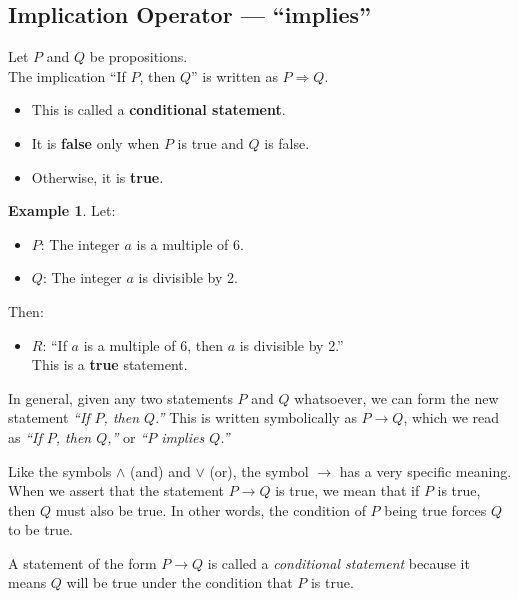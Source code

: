 \documentclass[
]{book}
\providecommand{\tightlist}{%
  \setlength{\itemsep}{0pt}\setlength{\parskip}{0pt}}
\theoremstyle{definition}
\theoremstyle{definition}
\newtheorem{example}{Example}[chapter]
\theoremstyle{definition}
\theoremstyle{definition}
\theoremstyle{remark}
\begin{document}
\subsection{Implication Operator --- ``implies''}\label{implication-operator-implies}

Let \(P\) and \(Q\) be propositions.\\
The implication ``If \(P\), then \(Q\)'' is written as \(P \Rightarrow Q\).

\begin{itemize}
\tightlist
\item
  This is called a \textbf{conditional statement}.
\item
  It is \textbf{false} only when \(P\) is true and \(Q\) is false.
\item
  Otherwise, it is \textbf{true}.
\end{itemize}

\begin{example}
\protect\hypertarget{exm:unnamed-chunk-20}{}\label{exm:unnamed-chunk-20}Let:

\begin{itemize}
\tightlist
\item
  \(P\): The integer \(a\) is a multiple of 6.
\item
  \(Q\): The integer \(a\) is divisible by 2.
\end{itemize}

Then:

\begin{itemize}
\tightlist
\item
  \(R\): ``If \(a\) is a multiple of 6, then \(a\) is divisible by 2.''\\
  This is a \textbf{true} statement.
\end{itemize}

In general, given any two statements \(P\) and \(Q\) whatsoever, we can form the new statement \emph{``If \( P \), then \( Q \).''} This is written symbolically as \(P \rightarrow Q\), which we read as \emph{``If \( P \), then \( Q \),''} or \emph{``\( P \) implies \( Q \).''}

Like the symbols \(\land\) (and) and \(\lor\) (or), the symbol \(\rightarrow\) has a very specific meaning. When we assert that the statement \(P \rightarrow Q\) is true, we mean that if \(P\) is true, then \(Q\) must also be true. In other words, the condition of \(P\) being true forces \(Q\) to be true.

A statement of the form \(P \rightarrow Q\) is called a \emph{conditional statement} because it means \(Q\) will be true under the condition that \(P\) is true.
\end{example}
\end{document}
